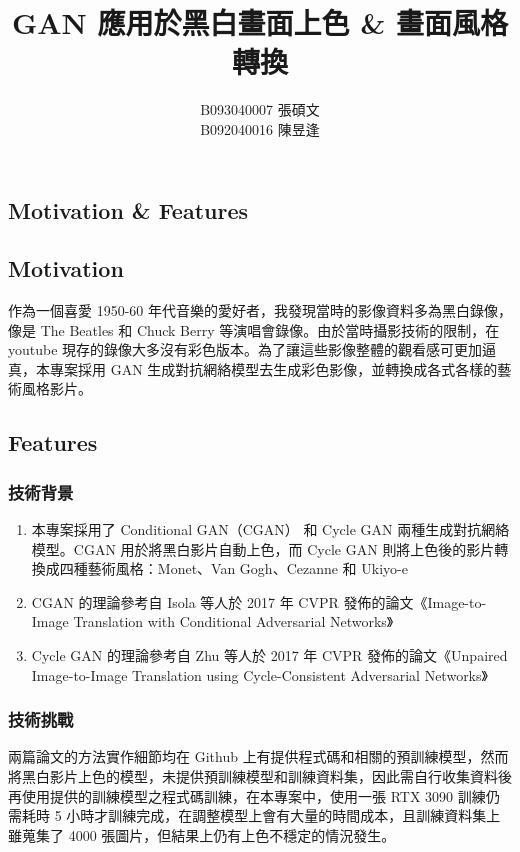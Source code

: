 \documentclass[a4paper, 12pt]{article}
\begin{document}
\renewcommand{\abstractname}{\large 摘要}

\newcommand{\pluseq}{\mathrel{+}=}

\begin{CJK}{UTF8}{bkai}
	\title{GAN 應用於黑白畫面上色 \& 畫面風格轉換}
	\author{B093040007 張碩文 \\ B092040016 陳昱逢}
	\date{}
	\maketitle
    \section{Motivation \& Features}
		\subsection{Motivation}
		作為一個喜愛 1950-60 年代音樂的愛好者，我發現當時的影像資料多為黑白錄像，像是 The Beatles 和 Chuck Berry 等演唱會錄像。由於當時攝影技術的限制，在 youtube 現存的錄像大多沒有彩色版本。為了讓這些影像整體的觀看感可更加逼真，本專案採用 GAN 生成對抗網絡模型去生成彩色影像，並轉換成各式各樣的藝術風格影片。
		\subsection{Features}
			\subsubsection{技術背景}
			\begin{enumerate}
				\item 本專案採用了 Conditional GAN（CGAN）\cite{pix2pix} 和 Cycle GAN \cite{cyclegan} 兩種生成對抗網絡模型。CGAN \cite{pix2pix}  用於將黑白影片自動上色，而 Cycle GAN \cite{cyclegan} 則將上色後的影片轉換成四種藝術風格：Monet、Van Gogh、Cezanne 和 Ukiyo-e
				\item CGAN \cite{pix2pix} 的理論參考自 Isola 等人於 2017 年 CVPR 發佈的論文《Image-to-Image Translation with Conditional Adversarial Networks》
				\item Cycle GAN \cite{cyclegan} 的理論參考自 Zhu 等人於 2017 年 CVPR 發佈的論文《Unpaired Image-to-Image Translation using Cycle-Consistent Adversarial Networks》 
			\end{enumerate}
			\subsubsection{技術挑戰}
			兩篇論文的方法實作細節均在 Github \cite{torch-cyclegan-pix2pix} 上有提供程式碼和相關的預訓練模型，然而將黑白影片上色的模型，未提供預訓練模型和訓練資料集，因此需自行收集資料後再使用提供的訓練模型之程式碼訓練，在本專案中，使用一張 RTX 3090 訓練仍需耗時 5 小時才訓練完成，在調整模型上會有大量的時間成本，且訓練資料集上雖蒐集了 4000 張圖片，但結果上仍有上色不穩定的情況發生。

\end{CJK}
\end{document}
